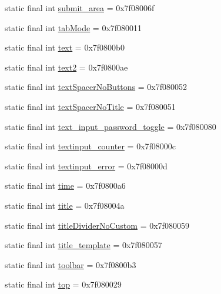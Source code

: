 \begin{CompactItemize}
\item 
static final int \hyperlink{classandroid_1_1support_1_1v4_1_1_r_1_1id_6170f6a9736195215c478b76f8a0930e}{submit\_\-area} = 0x7f08006f
\item 
static final int \hyperlink{classandroid_1_1support_1_1v4_1_1_r_1_1id_10acdbba9f807d6035c40f1083955d93}{tabMode} = 0x7f080011
\item 
static final int \hyperlink{classandroid_1_1support_1_1v4_1_1_r_1_1id_5ee622676e61de7f0e2ddf82a34f05fe}{text} = 0x7f0800b0
\item 
static final int \hyperlink{classandroid_1_1support_1_1v4_1_1_r_1_1id_22d6716722ec7ad0cc063a05276d2b64}{text2} = 0x7f0800ae
\item 
static final int \hyperlink{classandroid_1_1support_1_1v4_1_1_r_1_1id_c64e985ede3dd59e6250378be5b5910a}{textSpacerNoButtons} = 0x7f080052
\item 
static final int \hyperlink{classandroid_1_1support_1_1v4_1_1_r_1_1id_17025ed833be904c13bc412a6d2750fa}{textSpacerNoTitle} = 0x7f080051
\item 
static final int \hyperlink{classandroid_1_1support_1_1v4_1_1_r_1_1id_85861864544cd8b75f06bb6641db0424}{text\_\-input\_\-password\_\-toggle} = 0x7f080080
\item 
static final int \hyperlink{classandroid_1_1support_1_1v4_1_1_r_1_1id_0a72dc2456999a3dbbf6bea9b36f4751}{textinput\_\-counter} = 0x7f08000c
\item 
static final int \hyperlink{classandroid_1_1support_1_1v4_1_1_r_1_1id_fc50741e4c40743509bbb46ced8e7315}{textinput\_\-error} = 0x7f08000d
\item 
static final int \hyperlink{classandroid_1_1support_1_1v4_1_1_r_1_1id_b971b53aef763e76ede9c88afad9ab54}{time} = 0x7f0800a6
\item 
static final int \hyperlink{classandroid_1_1support_1_1v4_1_1_r_1_1id_cf78f7d7de9176578ffbddf81ca41608}{title} = 0x7f08004a
\item 
static final int \hyperlink{classandroid_1_1support_1_1v4_1_1_r_1_1id_48a6a59ca71b80c5b88f4ab3b93e6994}{titleDividerNoCustom} = 0x7f080059
\item 
static final int \hyperlink{classandroid_1_1support_1_1v4_1_1_r_1_1id_a340dc7a6bb3fc1bec1611576b760045}{title\_\-template} = 0x7f080057
\item 
static final int \hyperlink{classandroid_1_1support_1_1v4_1_1_r_1_1id_6ac067002a34fdb9761ec4e512e1627b}{toolbar} = 0x7f0800b3
\item 
static final int \hyperlink{classandroid_1_1support_1_1v4_1_1_r_1_1id_1dbc157b87faa98e10d64f4dbc032f70}{top} = 0x7f080029

\end{CompactItemize}
